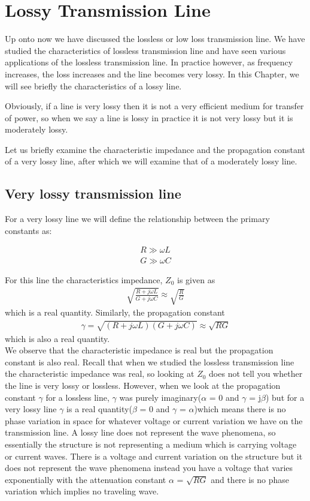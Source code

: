 \chapter{Lossy Transmission Line}
Up onto now we have discussed the lossless or low loss transmission line. We have studied the characteristics of lossless transmission line and have seen various applications of the lossless transmission line. In practice however, as frequency increases, the loss increases and the line becomes very lossy. In this Chapter, we will see briefly the characteristics of a lossy line.

Obviously, if a line is very lossy then it is not a very efficient medium for transfer of power, so when we say a line is lossy in practice it is not very lossy but it is moderately lossy.

Let us briefly examine the characteristic impedance and the propagation constant of a very lossy line, after which we will examine that of a moderately lossy line.

\section{Very lossy transmission line}For a very lossy line we will define the relationship between the primary constants as:

\begin{align*}
R\gg\omega L
\\G\gg\omega C
\end{align*}

For this line the characteristics impedance, $Z_0$ is given as
\begin{align*}
\sqrt{\frac{R + j\omega L}{G + j\omega C}} \approx  \sqrt{\frac{R}{G}}
\end{align*}
which is a real quantity. Similarly, the propagation constant 
\begin{align*}
\gamma = \sqrt{(R + j\omega L)(G + j\omega C)} \approx \sqrt{RG}
\end{align*}
which is also a real quantity.\\
We observe that the characteristic impedance is real but the propagation constant is also real. Recall that when we studied the lossless transmission line the characteristic impedance was real, so looking at $Z_0$ does not tell you whether the line is very lossy or lossless. However, when we look at the propagation constant  $\gamma$ for a lossless line, $\gamma$ was purely imaginary($\alpha$ = 0 and $\gamma$ = j$\beta$) but for  a very lossy line $\gamma$ is a real quantity($\beta$ = 0 and $\gamma$ = $\alpha$)which means there is no phase variation  in space for whatever voltage or current variation we have on the transmission line. A lossy line does not represent the wave phenomena, so essentially the structure is not representing a medium which is carrying voltage or current waves. There is a voltage and current variation on the structure but it does not represent the wave phenomena instead you have a voltage that varies exponentially with the attenuation constant $\alpha$ = $\sqrt{RG}$ and there is no phase variation which implies no traveling wave.

